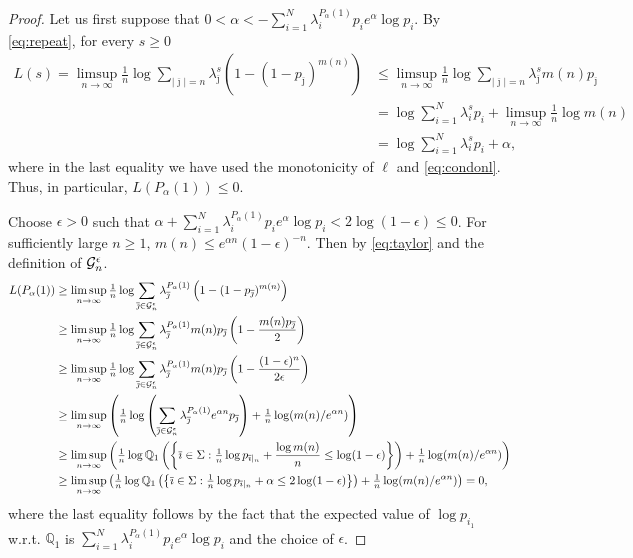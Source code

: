 \documentclass[12pt,]{article}
\theoremstyle{definition}
\theoremstyle{remark}
\renewcommand{\Bbb}[1]{\mathbb{#1}}
\newcommand{\bbQ}{{\Bbb Q}}         %
\newcommand{\cG}{{\cal G}}
\newcommand{\0}{\mathbf{0}}
\newcommand{\bi}{{\overline {\imath}}}
\newcommand{\bj}{{\overline  {\jmath}}}
\begin{document}
\begin{proof}
  Let us first suppose that $0<\alpha<-\sum_{i=1}^N\lambda_i^{P_\alpha(1)}p_ie^\alpha \log p_i$. By
  \cref{eq:repeat}, for every $s\geq0$
  \[\begin{split}
    L(s)=\limsup_{n\to \infty} \tfrac 1n \log
    \sum_{|\bj|=n}\lambda_{\bj}^{s}\left(1-(1-p_{\bj})^{m(n)}\right)&\leq\limsup_{n\to \infty}
    \tfrac 1n \log \sum_{|\bj|=n}\lambda_{\bj}^{s}m(n)p_{\bj}\\
    &=\log\sum_{i=1}^N\lambda_i^sp_i+\limsup_{n\to\infty}\tfrac1n\log m(n)\\
    &=\log\sum_{i=1}^N\lambda_i^sp_i+\alpha,
  \end{split}\]
  where in the last equality we have used the monotonicity of $\ell$ and \cref{eq:condonl}. Thus, in
  particular, $L(P_\alpha(1))\leq0$.

  Choose $\epsilon>0$ such that $\alpha+\sum_{i=1}^N\lambda_i^{P_\alpha(1)}p_ie^\alpha \log
  p_i<2\log(1-\epsilon)\leq0$. For sufficiently large $n\geq1$, $m(n)\leq e^{\alpha
  n}(1-\epsilon)^{-n}$. Then by \cref{eq:taylor} and the definition of $\cG_n^\epsilon$.
  \[
    \begin{split}
    L(P_\alpha(1))&\geq\limsup_{n\to \infty} \tfrac 1n \log \sum_{\bj\in
    \cG_n^\epsilon}\lambda_{\bj}^{P_\alpha(1)}\left(1-(1-p_{\bj})^{m(n)}\right)\\
		  &\geq\limsup_{n\to \infty} \tfrac 1n \log \sum_{\bj\in \cG_n^\epsilon}\lambda_{\bj}^{P_\alpha(1)}m(n)p_{\bj}\left(1-\frac{m(n)p_{\bj}}{2}\right)\\
		  &\geq\limsup_{n\to \infty} \tfrac 1n \log \sum_{\bj\in \cG_n^\epsilon}\lambda_{\bj}^{P_\alpha(1)}m(n)p_{\bj}\left(1-\frac{(1-\epsilon)^n}{2\epsilon}\right)\\
		  &\geq\limsup_{n\to \infty} \left(\tfrac 1n \log\left( \sum_{\bj\in \cG_n^\epsilon}\lambda_{\bj}^{P_\alpha(1)}e^{\alpha n}p_{\bj}\right)+\tfrac 1n \log (m(n)/e^{\alpha n})\right)\\
		  &\geq\limsup_{n\to \infty} \left(\tfrac 1n \log \bbQ_1\left(\left\{\bi\in\Sigma:\tfrac1n\log p_{\bi|_n}+\frac{\log m(n)}{n}\leq\log(1-\epsilon)\right\}\right)+\tfrac 1n \log (m(n)/e^{\alpha n})\right)\\
		  &\geq\limsup_{n\to \infty} \left(\tfrac 1n \log \bbQ_1\left(\left\{\bi\in\Sigma:\tfrac1n\log p_{\bi|_n}+\alpha\leq2\log(1-\epsilon)\right\}\right)+\tfrac 1n \log (m(n)/e^{\alpha n})\right)=0,
    \end{split}
  \]
  where the last equality follows by the fact that the expected value of $\log p_{i_1}$ w.r.t.
  $\bbQ_1$ is $\sum_{i=1}^N\lambda_i^{P_\alpha(1)}p_ie^\alpha \log p_i$ and the choice of
  $\epsilon$.


\end{proof}
\end{document}
